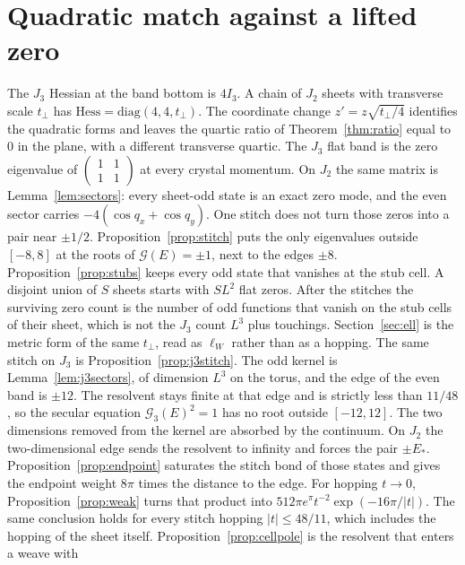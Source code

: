 \section{Quadratic match against a lifted zero}
\label{sec:h-j3w}

The \(J_3\) Hessian at the band bottom is \(4I_3\).
A chain of \(J_2\) sheets with transverse scale \(t_\perp\) has
\(\mathrm{Hess}=\mathrm{diag}(4,4,t_\perp)\).
The coordinate change \(z'=z\sqrt{t_\perp/4}\) identifies the quadratic forms
and leaves the quartic ratio of Theorem~\ref{thm:ratio} equal to \(0\) in the
plane, with a different transverse quartic.
The \(J_3\) flat band is the zero eigenvalue of
\(\begin{pmatrix}1&1\\1&1\end{pmatrix}\) at every crystal momentum.
On \(J_2\) the same matrix is Lemma~\ref{lem:sectors}: every
sheet-odd state is an exact zero mode, and the even sector carries
\(-4(\cos q_x+\cos q_y)\).
One stitch does not turn those zeros into a pair near \(\pm 1/2\).
Proposition~\ref{prop:stitch} puts the only eigenvalues outside \([-8,8]\)
at the roots of \(\mathcal{G}(E)=\pm 1\), next to the edges \(\pm 8\).
Proposition~\ref{prop:stubs} keeps every odd state that vanishes at the
stub cell.
A disjoint union of \(S\) sheets starts with \(S L^2\) flat zeros.
After the stitches the surviving zero count is the number of odd functions
that vanish on the stub cells of their sheet, which is not the \(J_3\)
count \(L^3\) plus touchings.
Section~\ref{sec:ell} is the metric form of the same \(t_\perp\), read as
\(\ell_W\) rather than as a hopping.
The same stitch on \(J_3\) is Proposition~\ref{prop:j3stitch}.
The odd kernel is Lemma~\ref{lem:j3sectors}, of dimension \(L^3\) on the
torus, and the edge of the even band is \(\pm 12\).
The resolvent stays finite at that edge and is strictly less than
\(11/48\), so the secular equation \(\mathcal{G}_3(E)^2=1\) has no root
outside \([-12,12]\).
The two dimensions removed from the kernel are absorbed by the continuum.
On \(J_2\) the two-dimensional edge sends the resolvent to infinity and
forces the pair \(\pm E_*\).
Proposition~\ref{prop:endpoint} saturates the stitch bond of those states
and gives the endpoint weight \(8\pi\) times the distance to the edge.
For hopping \(t\to 0\), Proposition~\ref{prop:weak} turns that product into
\(512\pi e^{\pi} t^{-2}\exp(-16\pi/|t|)\).
The same conclusion holds for every stitch hopping \(|t|\le 48/11\),
which includes the hopping of the sheet itself.
Proposition~\ref{prop:cellpole} is the resolvent that enters a weave with
